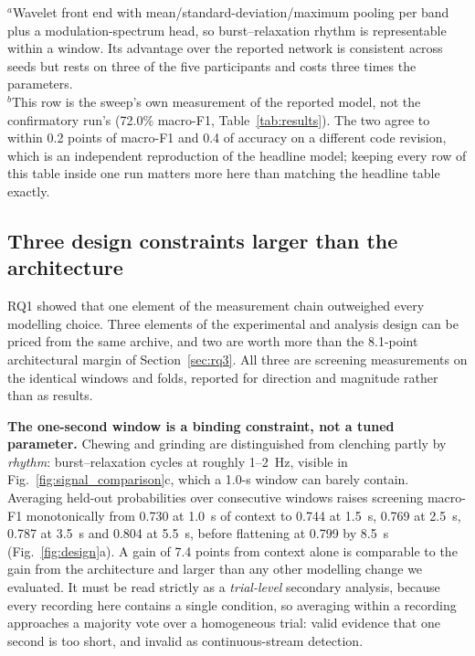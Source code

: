 \documentclass[pdflatex,sn-nature,iicol]{sn-jnl}
\begin{document}
\begin{table}[t]
\begin{flushleft}
  $^{a}$Wavelet front end with mean/standard-deviation/maximum pooling per band plus a modulation-spectrum head, so burst--relaxation rhythm is representable within a window. Its advantage over the reported network is consistent across seeds but rests on three of the five participants and costs three times the parameters.\\
  $^{b}$This row is the sweep's own measurement of the reported model, not the confirmatory run's (72.0\% macro-F1, Table~\ref{tab:results}). The two agree to within 0.2 points of macro-F1 and 0.4 of accuracy on a different code revision, which is an independent reproduction of the headline model; keeping every row of this table inside one run matters more here than matching the headline table exactly.
  \end{flushleft}
\end{table}

\subsection{Three design constraints larger than the architecture}
\label{sec:constraints}

RQ1 showed that one element of the measurement chain outweighed every modelling choice. Three elements of the experimental and analysis design can be priced from the same archive, and two are worth more than the 8.1-point architectural margin of Section~\ref{sec:rq3}. All three are screening measurements on the identical windows and folds, reported for direction and magnitude rather than as results.

\textbf{The one-second window is a binding constraint, not a tuned parameter.} Chewing and grinding are distinguished from clenching partly by \emph{rhythm}: burst--relaxation cycles at roughly 1--2~Hz, visible in Fig.~\ref{fig:signal_comparison}c, which a 1.0-s window can barely contain. Averaging held-out probabilities over consecutive windows raises screening macro-F1 monotonically from 0.730 at 1.0~s of context to 0.744 at 1.5~s, 0.769 at 2.5~s, 0.787 at 3.5~s and 0.804 at 5.5~s, before flattening at 0.799 by 8.5~s (Fig.~\ref{fig:design}a). A gain of 7.4 points from context alone is comparable to the gain from the architecture and larger than any other modelling change we evaluated. It must be read strictly as a \emph{trial-level} secondary analysis, because every recording here contains a single condition, so averaging within a recording approaches a majority vote over a homogeneous trial: valid evidence that one second is too short, and invalid as continuous-stream detection.
\end{document}

